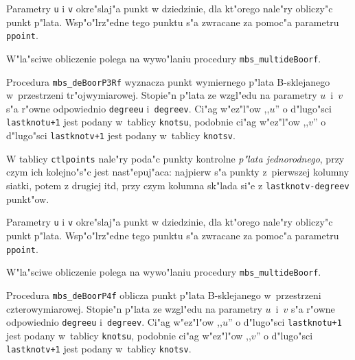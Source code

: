 Parametry \texttt{u} i \texttt{v} okre"slaj"a punkt w dziedzinie, dla
kt"orego nale"ry obliczy"c punkt p"lata. Wsp"o"lrz"edne tego punktu s"a
zwracane za pomoc"a parametru \texttt{ppoint}.

W"la"sciwe obliczenie polega na wywo"laniu procedury
\texttt{mbs\_multideBoorf}.

\vspace{\bigskipamount}
\begin{sloppypar}
Procedura \texttt{mbs\_deBoorP3Rf} wyznacza punkt wymiernego p"lata
B-sklejanego
w~przes\-trze\-ni tr"ojwymiarowej. Stopie"n p"lata ze wzgl"edu na parametry
$u$~i~$v$ s"a r"owne odpowiednio \texttt{degreeu} i~\texttt{degreev}.
Ci"ag w"ez"l"ow ,,$u$'' o d"lugo"sci \texttt{lastknotu+1} jest podany
w~tablicy \texttt{knotsu}, podobnie ci"ag w"ez"l"ow ,,$v$'' o d"lugo"sci
\texttt{lastknotv+1} jest podany w~tablicy \texttt{knotsv}.
\end{sloppypar}

W tablicy \texttt{ctlpoints} nale"ry poda"c punkty kontrolne \emph{p"lata
jednorodnego}, przy czym ich kolejno"s"c jest nast"epuj"aca: najpierw s"a
punkty z~pierwszej kolumny siatki, potem z drugiej itd, przy czym kolumna
sk"lada si"e z \texttt{lastknotv-degreev} punkt"ow.

Parametry \texttt{u} i \texttt{v} okre"slaj"a punkt w dziedzinie, dla
kt"orego nale"ry obliczy"c punkt p"lata. Wsp"o"lrz"edne tego punktu s"a
zwracane za pomoc"a parametru \texttt{ppoint}.

W"la"sciwe obliczenie polega na wywo"laniu procedury
\texttt{mbs\_multideBoorf}.


\vspace{\bigskipamount}
Procedura \texttt{mbs\_deBoorP4f} oblicza punkt p"lata B-sklejanego
w~przestrzeni czterowymiarowej. Stopie"n p"lata ze wzgl"edu na parametry
$u$~i~$v$ s"a r"owne odpowiednio \texttt{degreeu} i~\texttt{degreev}.
Ci"ag w"ez"l"ow ,,$u$'' o d"lugo"sci \texttt{lastknotu+1} jest podany
w~tablicy \texttt{knotsu}, podobnie ci"ag w"ez"l"ow ,,$v$'' o d"lugo"sci
\texttt{lastknotv+1} jest podany w~tablicy \texttt{knotsv}.

